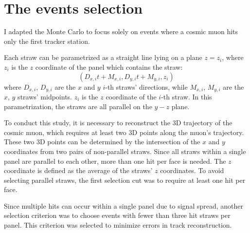 \section{The events selection}\label{eventselection}

I adapted the Monte Carlo to focus solely on 
events where a cosmic muon hits only the first 
tracker station.

Each straw can be parametrized as a straight line 
lying on a plane $z = z_i$, where $z_i$ is the $z$ 
coordinate of the panel which contains the straw:
\begin{equation}\label{equaretta}
    (D_{x,i}t+M_{x,i},D_{y,i}t+M_{y,i},z_i)
\end{equation}
where $D_{x,i}$, $D_{y,i}$ are the $x$ and $y$ 
$i$-th straws' directions, while $M_{x,i}$, $M_{y,i}$ 
are the $x$, $y$ straws' midpoints. $z_i$ is the 
$z$ coordinate of the $i$-th straw.
In this parametrization, the straws are all parallel 
on the $y-z$ plane.

To conduct this study, it is necessary to 
reconstruct the 3D trajectory of the cosmic muon, 
which requires at least two 3D points along the muon's 
trajectory. These two 3D points can be 
determined by the intersection of the 
$x$ and $y$ coordinates from two pairs 
of non-parallel straws. Since all straws 
within a single panel are parallel to each other, 
more than one hit per face is needed. The $z$ 
coordinate is defined as the average of the 
straws' $z$ coordinates. To avoid selecting parallel straws, 
the first selection cut 
was to require at least one hit per face.

Since multiple hits can occur within a 
single panel due to signal spread, another 
selection criterion was to choose events 
with fewer than three hit straws per panel. 
This criterion was selected to minimize errors 
in track reconstruction.
